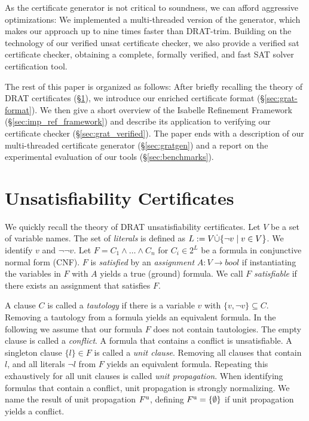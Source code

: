 \documentclass{llncs}
\begin{document}
As the certificate generator is not critical to soundness, we can afford aggressive optimizations:
We implemented a multi-threaded version of the generator, which makes our approach up to nine times faster than DRAT-trim.
Building on the technology of our verified unsat certificate checker, we also provide a verified sat certificate checker, 
obtaining a complete, formally verified, and fast SAT solver certification tool.

The rest of this paper is organized as follows: 
After briefly recalling the theory of DRAT certificates (\S\ref{sec:unsat_cert}), we introduce our enriched certificate format (\S\ref{sec:grat-format}).
We then give a short overview of the Isabelle Refinement Framework (\S\ref{sec:imp_ref_framework})
and describe its application to verifying our certificate checker (\S\ref{sec:grat_verified}). 
The paper ends with a description of our multi-threaded certificate generator (\S\ref{sec:gratgen}) and a report on the experimental evaluation 
of our tools (\S\ref{sec:benchmarks}).

\section{Unsatisfiability Certificates}\label{sec:unsat_cert}
We quickly recall the theory of DRAT unsatisfiability certificates. 
Let $V$ be a set of variable names. The set of \emph{literals} is defined as $L := V \dot{\cup} \{\neg v \mid v\in V \}$.
We identify $v$ and $\neg\neg v$.
Let $F = C_1 \wedge \ldots \wedge C_n$ for $C_i \in 2^L$ be a formula in conjunctive normal form (CNF). 
$F$ is \emph{satisfied} by an \emph{assignment} $A : V \to bool$ if instantiating the variables in $F$ with $A$ yields a true (ground) formula.
We call $F$ \emph{satisfiable} if there exists an assignment that satisfies $F$.

A clause $C$ is called a \emph{tautology} if there is a variable $v$ with $\{v,\neg v\} \subseteq C$. Removing a tautology from a formula yields an equivalent formula.
In the following we assume that our formula $F$ does not contain tautologies.
The empty clause is called a \emph{conflict}. A formula that contains a conflict is unsatisfiable. 
A singleton clause $\{l\} \in F$ is called a \emph{unit clause}. Removing all clauses that contain $l$, and all literals $\neg l$ from $F$ yields an equivalent formula.
Repeating this exhaustively for all unit clauses is called \emph{unit propagation}. When identifying formulas that contain a conflict, unit propagation is strongly normalizing. 
We name the result of unit propagation $F^{\textrm u}$, defining $F^{\textrm u} = \{\emptyset\}$ if unit propagation yields a conflict.
\end{document}
